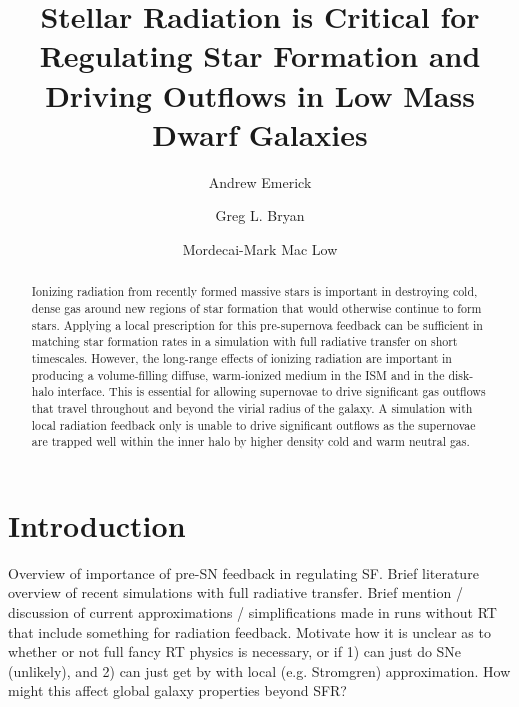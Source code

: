 \documentclass[twocolumn]{aastex62}
\begin{document}
\title{Stellar Radiation is Critical for Regulating Star Formation and Driving Outflows in Low Mass Dwarf Galaxies}


\author{Andrew Emerick}

\author{Greg L. Bryan}

\author{Mordecai-Mark Mac Low}
\nocollaboration

\begin{abstract}
Ionizing radiation from recently formed massive stars is important in destroying cold, dense gas around new regions of star formation that would otherwise continue to form stars. Applying a local prescription for this pre-supernova feedback can be sufficient in matching star formation rates in a simulation with full radiative transfer on short timescales. However, the long-range effects of ionizing radiation are important in producing a volume-filling diffuse, warm-ionized medium in the ISM and in the disk-halo interface. This is essential for allowing supernovae to drive significant gas outflows that travel throughout and beyond the virial radius of the galaxy. A simulation with local radiation feedback only is unable to drive significant outflows as the supernovae are trapped well within the inner halo by higher density cold and warm neutral gas.
\end{abstract}


\section{Introduction} \label{sec:intro}
Overview of importance of pre-SN feedback in regulating SF. Brief literature overview of recent simulations with full radiative transfer. Brief mention / discussion of current approximations / simplifications made in runs without RT that include something for radiation feedback. Motivate how it is unclear as to whether or not full fancy RT physics is necessary, or if 1) can just do SNe (unlikely), and 2) can just get by with local (e.g. Stromgren) approximation. How might this affect global galaxy properties beyond SFR?
\end{document}
